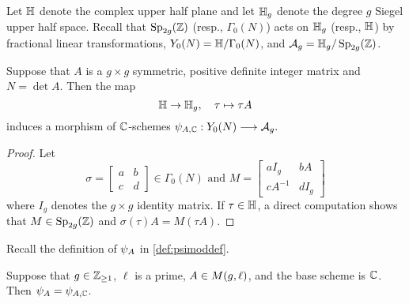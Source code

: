 \documentclass{amsart}
\begin{document}
Let $\mathbb{H}$ denote the complex upper half plane and let $\mathbb{H}_g$ denote the degree $g$ Siegel upper half space. Recall that $\operatorname{Sp}_{2g}(\mathbb{Z})$ (resp., $\Gamma_0(N)$) acts on $\mathbb{H}_g$ (resp., $\mathbb{H}$) by fractional linear transformations,
 $Y_0(N) = \mathbb{H}/\Gamma_0(N)$, and $\mathcal{A}_g = \mathbb{H}_g/\operatorname{Sp}_{2g}(\mathbb{Z})$.
\begin{lemma}\label{lem:psi-A-n}
Suppose that $A$ is a $g \times g$ symmetric, positive definite integer matrix and $N = \det A$.
Then the map \[
  \mathbb{H} \to \mathbb{H}_g, \quad  \tau \mapsto \tau A
\]
induces a morphism of $\mathbb{C}$-schemes
$
  {\psi}_{A, \mathbb{C}}: Y_0(N) \longrightarrow \mathcal{A}_g.
$
\end{lemma}

\begin{proof}
Let
\[
\sigma = \begin{bmatrix} a & b \\ c & d \end{bmatrix} \in \Gamma_0(N) \text{ and } M = \begin{bmatrix} aI_g & bA \\ cA^{-1} & dI_g \end{bmatrix}
\]
where $I_g$ denotes the $g \times g$ identity matrix.
If $\tau \in \mathbb{H}$, a direct computation shows that $M \in\operatorname{Sp}_{2g}(\mathbb{Z})$
and  $\sigma(\tau)A = M(\tau A)$.
\end{proof}

Recall the definition of $\psi_{A}$ in \eqref{def:psimoddef}.

\begin{proposition}\label{prop:psimod-over-c}
Suppose that $g\in\mathbb{Z}_{\ge 1}$, $\ell$ is a prime, $A \in M(g,\ell)$, and
 the base scheme is $\mathbb{C}$. Then $\psi_{A} = {\psi}_{A, \mathbb{C}}$.
\end{proposition}
\end{document}
